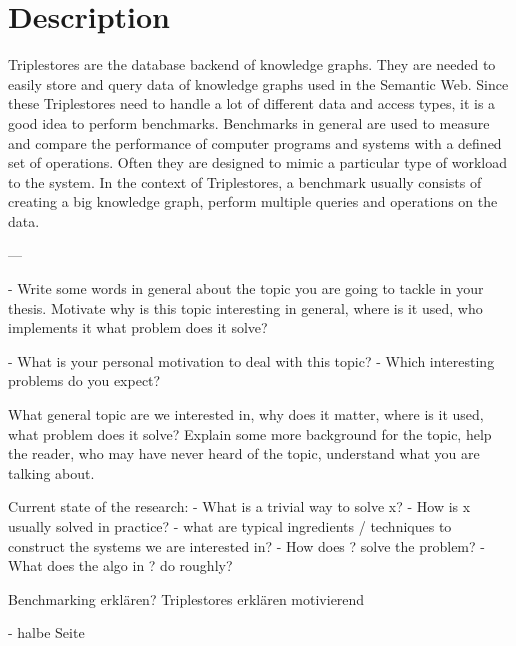 \chapter{Description}
\label{ch:description}

Triplestores are the database backend of knowledge graphs. 
They are needed to easily store and query data of knowledge graphs used in the Semantic Web.
Since these Triplestores need to handle a lot of different data and access types, it is a good idea to perform benchmarks.
Benchmarks in general are used to measure and compare the performance of computer programs and systems with a defined set of operations.
Often they are designed to mimic a particular type of workload to the system.
In the context of Triplestores, a benchmark usually consists of creating a big knowledge graph, perform multiple queries and operations on the data.



---

- Write some words in general about the topic you are going to tackle in your thesis. Motivate why is this topic interesting in general, where is it used, who implements it what problem does it solve?

- What is your personal motivation to deal with this topic?
- Which interesting problems do you expect?

What general topic are we interested in, why does it matter, where is it used, what problem does it solve?
Explain some more background for the topic, help the reader, who may have never heard of the topic, understand what you are talking about.

Current state of the research:
- What is a trivial way to solve x?
- How is x usually solved in practice?
- what are typical ingredients / techniques to construct the systems we are interested in?
- How does ? solve the problem?
- What does the algo in ? do roughly?


Benchmarking erklären?
Triplestores erklären motivierend


- halbe Seite

